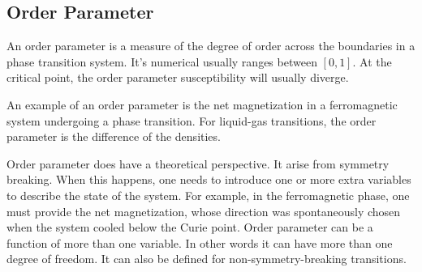 	\subsection{Order Parameter}
	An order parameter is a measure of the degree of order across the boundaries in a phase transition system. It's numerical usually ranges between $[0,1]$. At the critical point, the order parameter susceptibility will usually diverge.
	
	An example of an order parameter is the net magnetization in a ferromagnetic system undergoing a phase transition. For liquid-gas transitions, the order parameter is the difference of the densities.
	
	Order parameter does have a theoretical perspective. It arise from symmetry breaking. When this happens, one needs to introduce one or more extra variables to describe the state of the system. For example, in the ferromagnetic phase, one must provide the net magnetization, whose direction was spontaneously chosen when the system cooled below the Curie point. Order parameter can be a function of more than one variable. In other words it can have more than one degree of freedom. It can also be defined for non-symmetry-breaking transitions. 

	
